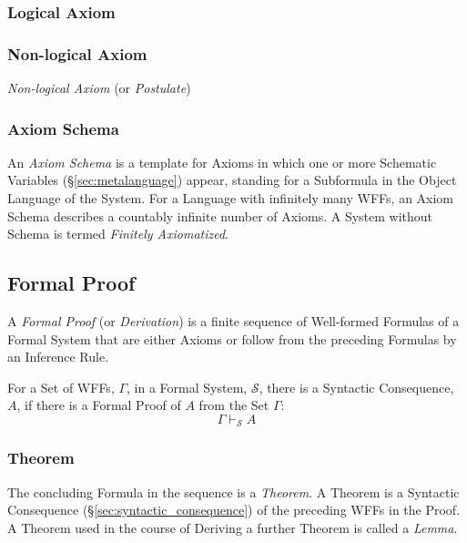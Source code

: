 \subsubsection{Logical Axiom}\label{sec:logical_axiom}



\subsubsection{Non-logical Axiom}\label{sec:nonlogical_axiom}

\emph{Non-logical Axiom} (or \emph{Postulate})



\subsubsection{Axiom Schema}\label{sec:axiom_schema}

An \emph{Axiom Schema} is a template for Axioms in which one or more
Schematic Variables (\S\ref{sec:metalanguage}) appear, standing for a
Subformula in the Object Language of the System. For a Language with
infinitely many WFFs, an Axiom Schema describes a countably infinite
number of Axioms. A System without Schema is termed \emph{Finitely
  Axiomatized}.



\subsection{Formal Proof} \label{sec:formal_proof}

A \emph{Formal Proof} (or \emph{Derivation}) is a finite sequence of
Well-formed Formulas of a Formal System that are either Axioms or
follow from the preceding Formulas by an Inference Rule.

For a Set of WFFs, $\Gamma$, in a Formal System, $\mathcal{S}$, there
is a Syntactic Consequence, $A$, if there is a Formal Proof of $A$
from the Set $\Gamma$:
\[
    \Gamma \vdash_{\mathcal{S}} A
\]



\subsubsection{Theorem} \label{sec:theorem}

The concluding Formula in the sequence is a \emph{Theorem}. A Theorem
is a Syntactic Consequence (\S\ref{sec:syntactic_consequence}) of the
preceding WFFs in the Proof. A Theorem used in the course of Deriving
a further Theorem is called a \emph{Lemma}.



